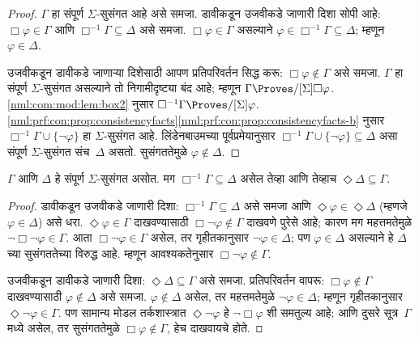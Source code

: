 \begin{proof}
  $\Gamma$ हा संपूर्ण $\Sigma$-सुसंगत आहे
  असे समजा. डावीकडून उजवीकडे जाणारी दिशा सोपी आहे:
  $\Box \varphi \in \Gamma$ आणि
  $\Box^{-1}\Gamma \subseteq \Delta$ असे
  समजा. $\Box\varphi \in \Gamma$ असल्याने
  $\varphi \in \Box^{-1}\Gamma \subseteq \Delta$;
  म्हणून $\varphi \in \Delta$.

  उजवीकडून डावीकडे जाणाऱ्या दिशेसाठी आपण प्रतिपरिवर्तन सिद्ध करू:
  $\Box\varphi \notin \Gamma$ असे समजा.
  $\Gamma$ हा संपूर्ण $\Sigma$-सुसंगत
  असल्याने तो निगामीदृष्ट्या बंद आहे;
  म्हणून $\Gamma \Proves/[\Sigma] \Box \varphi$.
  \ref{nml:com:mod:lem:box2} नुसार
  $\Box^{-1}\Gamma \Proves/[\Sigma] \varphi$.
  \ref{nml:prf:con:prop:consistencyfacts}\ref{nml:prf:con:prop:consistencyfacts-b}
  नुसार $\Box^{-1}\Gamma \cup \{ \lnot\varphi \}$
  हा $\Sigma$-सुसंगत आहे. लिंडेनबाउमच्या
  पूर्वप्रमेयानुसार $\Box^{-1}\Gamma \cup
  \{ \lnot\varphi \} \subseteq \Delta$ असा
  संपूर्ण $\Sigma$-सुसंगत संच~$\Delta$
  असतो. सुसंगततेमुळे $\varphi \notin \Delta$.
\end{proof}


\begin{lem}\label{nml:com:mod:lem:box-iff-diamond}
  $\Gamma$ आणि $\Delta$ हे संपूर्ण
  $\Sigma$-सुसंगत असोत. मग
  $\Box^{-1}\Gamma \subseteq \Delta$
  असेल तेव्हा आणि तेव्हाच
  $\Diamond\Delta \subseteq \Gamma$.
\end{lem}

\begin{proof}
  डावीकडून उजवीकडे जाणारी दिशा: $\Box^{-1}\Gamma
  \subseteq \Delta$ असे समजा आणि
  $\Diamond\varphi \in \Diamond\Delta$
  (म्हणजे $\varphi \in \Delta$) असे धरा.
  $\Diamond\varphi \in \Gamma$ दाखवण्यासाठी
  $\Box\lnot\varphi \notin \Gamma$ दाखवणे
  पुरेसे आहे; कारण मग महत्तमतेमुळे
  $\lnot\Box\lnot \varphi \in \Gamma$.
  आता $\Box\lnot\varphi \in \Gamma$
  असेल, तर गृहीतकानुसार
  $\lnot\varphi \in \Delta$; पण
  $\varphi \in \Delta$ असल्याने हे
  $\Delta$ च्या सुसंगततेच्या
  विरुद्ध आहे. म्हणून आवश्यकतेनुसार
  $\Box\lnot\varphi \notin \Gamma$.

  उजवीकडून डावीकडे जाणारी दिशा: $\Diamond\Delta
  \subseteq \Gamma$ असे समजा.
  प्रतिपरिवर्तन वापरू: $\Box\varphi
  \notin \Gamma$ दाखवण्यासाठी
  $\varphi \notin \Delta$ असे समजा.
  $\varphi \notin \Delta$ असेल,
  तर महत्तमतेमुळे
  $\lnot\varphi \in \Delta$;
  म्हणून गृहीतकानुसार
  $\Diamond\lnot\varphi \in \Gamma$.
  पण सामान्य मोडल तर्कशास्त्रात
  $\Diamond\lnot\varphi$ हे
  $\lnot\Box \varphi$ शी समतुल्य आहे;
  आणि दुसरे सूत्र~$\Gamma$ मध्ये
  असेल, तर सुसंगततेमुळे
  $\Box\varphi \notin\Gamma$,
  हेच दाखवायचे होते.
\end{proof}






